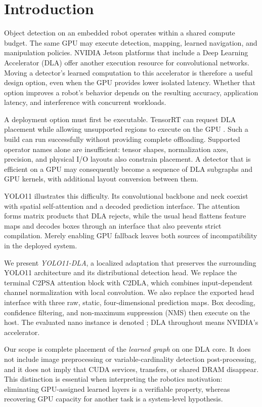 \section{Introduction}
\label{sec:introduction}
Object detection on an embedded robot operates within a shared compute budget.
The same GPU may execute detection, mapping, learned navigation, and manipulation
policies. NVIDIA Jetson platforms that include a Deep Learning Accelerator
(DLA) offer another execution resource for convolutional networks. Moving a
detector's learned computation to this accelerator is therefore a useful design
option, even when the GPU provides lower isolated latency. Whether that option
improves a robot's behavior depends on the resulting accuracy, application
latency, and interference with concurrent workloads.

A deployment option must first be executable. TensorRT can request DLA
placement while allowing unsupported regions to execute on the GPU
\cite{nvidia_dla_working}. Such a build can run successfully without providing
complete offloading. Supported operator names alone are insufficient: tensor
shapes, normalization axes, precision, and physical I/O layouts also constrain
placement. A detector that is efficient on a GPU may consequently become a
sequence of DLA subgraphs and GPU kernels, with additional layout conversion
between them.

YOLO11 \cite{jocher2024yolo11} illustrates this difficulty. Its convolutional
backbone and neck coexist with spatial self-attention and a decoded prediction
interface. The attention forms matrix products that DLA rejects, while the
usual head flattens feature maps and decodes boxes through an interface that
also prevents strict compilation. Merely enabling GPU fallback leaves both
sources of incompatibility in the deployed system.

We present \emph{YOLO11-DLA}, a localized adaptation that preserves the
surrounding YOLO11 architecture and its distributional detection head. We
replace the terminal C2PSA attention block with C2DLA, which combines
input-dependent channel normalization with local convolution. We also replace
the exported head interface with three raw, static, four-dimensional prediction
maps. Box decoding, confidence filtering, and non-maximum suppression (NMS)
then execute on the host. The evaluated nano instance is denoted \model;
DLA throughout means NVIDIA's accelerator.

Our scope is complete placement of the \emph{learned graph} on one DLA core.
It does not include image preprocessing or variable-cardinality detection
post-processing, and it does not imply that CUDA services, transfers, or shared
DRAM disappear. This distinction is essential when interpreting the robotics
motivation: eliminating GPU-assigned learned layers is a verifiable property,
whereas recovering GPU capacity for another task is a system-level hypothesis.

